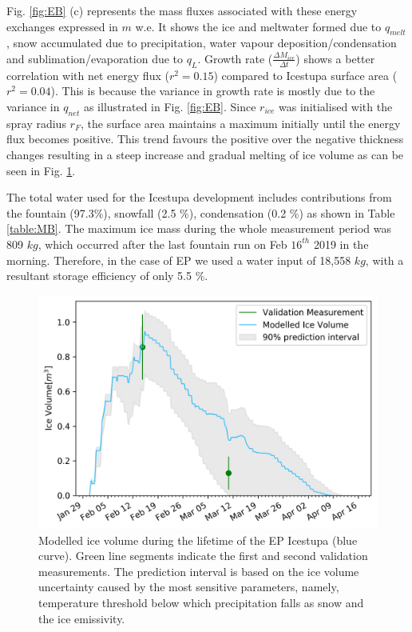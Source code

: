 \documentclass[utf8]{frontiersSCNS} %
\begin{document}
Fig. \ref{fig:EB} (c) represents the mass fluxes associated with these energy exchanges expressed in $m$ w.e. It shows
the ice and meltwater formed due to $q_{melt}$, snow accumulated due to precipitation, water vapour
deposition/condensation and sublimation/evaporation due to $q_L$. Growth rate ($\frac{\Delta M_{ice}}{\Delta t}$)
shows a better correlation with net energy flux ($r^2 = 0.15$) compared to Icestupa surface area ($r^2 =
0.04$).  This is because the variance in growth rate is mostly due to the variance in $q_{net}$ as illustrated in Fig.
\ref{fig:EB}. Since $r_{ice}$ was initialised with the spray radius $r_F$, the surface area maintains a maximum
initially until the energy flux becomes positive. This trend favours the positive over the negative thickness changes
resulting in a steep increase and gradual melting of ice volume as can be seen in Fig. \ref{fig:results}.

The total water used for the Icestupa development includes contributions from the fountain (97.3\%), snowfall (2.5 \%),
condensation (0.2 \%) as shown in Table \ref{table:MB}. The maximum ice mass during the whole
measurement period was 809 $kg$, which occurred after the last fountain run on Feb $16^{th}$ 2019 in the morning.
Therefore, in the case of EP we used a water input of 18,558 $kg$, with a resultant storage efficiency of only 5.5 \%.

  \begin{figure} \begin{center} \includegraphics[width=15 cm]{Figures/Figure_8.jpg} \end{center} \caption{Modelled ice
  volume during the lifetime of the EP Icestupa (blue curve). Green line segments indicate the first and second
validation measurements. The prediction interval is based on the ice volume uncertainty caused by the most sensitive
parameters, namely, temperature threshold below which precipitation falls as snow and the ice emissivity.}
\label{fig:results} \end{figure}
  
\end{document}
